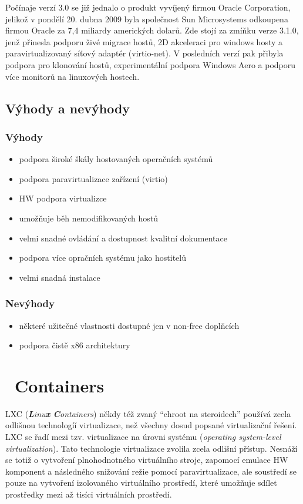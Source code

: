 Počínaje verzí 3.0 se již jednalo o produkt vyvíjený firmou Oracle Corporation, jelikož v pondělí 20. dubna 2009 byla společnost Sun Microsystems odkoupena firmou Oracle za 7,4 miliardy amerických dolarů. Zde stojí za zmíňku verze 3.1.0, jenž přinesla podporu živé migrace hostů, 2D akceleraci pro windows hosty a paravirtualizovaný síťový adaptér (virtio-net). V posledních verzí pak přibyla podpora pro klonování hostů, experimentální podpora Windows Aero a podporu více monitorů na linuxových hostech.

\subsection{Výhody a nevýhody}
\subsubsection{Výhody}
\begin{itemize}
  \item podpora široké škály hostovaných operačních systémů 
  \item podpora paravirtualizace zařízení (virtio)
  \item HW podpora virtualizce
  \item umožňuje běh nemodifikovaných hostů
  \item velmi snadné ovládání a dostupnost kvalitní dokumentace
  \item podpora více opračních systému jako hostitelů
  \item velmi snadná instalace
\end{itemize}
\subsubsection{Nevýhody}
\begin{itemize}
  \item některé užitečné vlastnosti dostupné jen v non-free doplňcích
  \item podpora čistě x86 architektury
\end{itemize}
\section{\linux\ Containers}
LXC (\emph{\textbf{L}inu\textbf{x} \textbf{C}ontainers}) někdy též zvaný "`chroot na steroidech"' používá zcela odlišnou technologíí virtualizace, než všechny dosud popsané virtualizační řešení. LXC se řadí mezi tzv. virtualizace na úrovni systému (\emph{operating system-level virtualization}). Tato technologie virtualizace zvolila zcela odlišní přístup. Nesnáží se totiž o vytvoření plnohodnotného virtuálního stroje, zapomocí emulace HW komponent a následného snižování režie pomocí paravirtualizace, ale soustředí se pouze na vytvoření izolovaného virtuálního prostředí, které umožňuje sdílet prostředky mezi až tisíci virtuálních prostředí.

